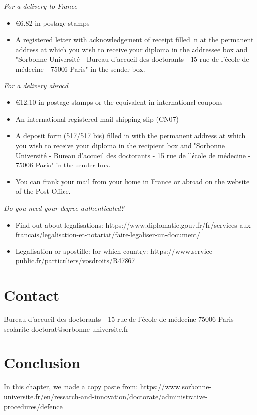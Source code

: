 \emph{For a delivery to France}

\begin{itemize}
    \item €6.82 in postage stamps
    \item A registered letter with acknowledgement of receipt filled in at the permanent address at which you wish to receive your diploma in the addressee box and "Sorbonne Université - Bureau d'accueil des doctorants - 15 rue de l'école de médecine - 75006 Paris" in the sender box.
\end{itemize}

\emph{For a delivery abroad}

\begin{itemize}
    \item €12.10 in postage stamps or the equivalent in international coupons
    \item An international registered mail shipping slip (CN07)
    \item A deposit form (517/517 bis) filled in with the permanent address at which you wish to receive your diploma in the recipient box and "Sorbonne Université - Bureau d'accueil des doctorants - 15 rue de l'école de médecine - 75006 Paris" in the sender box.
    \item You can frank your mail from your home in France or abroad on the website of the Post Office.
\end{itemize}

\emph{Do you need your degree authenticated?}

\begin{itemize}
    \item Find out about legalisations: https://www.diplomatie.gouv.fr/fr/services-aux-francais/legalisation-et-notariat/faire-legaliser-un-document/
    \item Legalisation or apostille: for which country: https://www.service-public.fr/particuliers/vosdroits/R47867
\end{itemize}

\section{Contact}
\label{sec:contact}

Bureau d'accueil des doctorants - 15 rue de l'école de médecine 75006 Paris
scolarite-doctorat@sorbonne-universite.fr

\section{Conclusion}
In this chapter, 
we made a copy paste from: https://www.sorbonne-universite.fr/en/research-and-innovation/doctorate/administrative-procedures/defence
